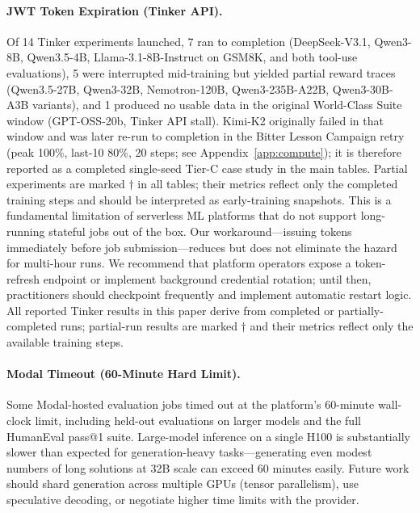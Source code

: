\documentclass{article}
\begin{document}
\paragraph{JWT Token Expiration (Tinker API).}
Of 14 Tinker experiments launched, 7 ran to completion (DeepSeek-V3.1,
Qwen3-8B, Qwen3.5-4B, Llama-3.1-8B-Instruct on GSM8K, and both tool-use
evaluations), 5 were interrupted mid-training but yielded partial reward
traces (Qwen3.5-27B, Qwen3-32B, Nemotron-120B, Qwen3-235B-A22B,
Qwen3-30B-A3B variants), and 1 produced no usable data in the original
World-Class Suite window (GPT-OSS-20b, Tinker API stall). Kimi-K2
originally failed in that window and was later re-run to completion in
the Bitter Lesson Campaign retry (peak 100\%, last-10 80\%, 20 steps;
see Appendix~\ref{app:compute}); it is therefore reported as a
completed single-seed Tier-C case study in the main tables.
Partial experiments are marked $\dagger$ in all tables; their
metrics reflect only the completed training steps and should be interpreted
as early-training snapshots. This is a fundamental
limitation of serverless ML platforms that do not support long-running
stateful jobs out of the box. Our workaround---issuing tokens immediately
before job submission---reduces but does not eliminate the hazard for
multi-hour runs. We recommend that platform operators expose a token-refresh
endpoint or implement background credential rotation; until then, practitioners
should checkpoint frequently and implement automatic restart logic. All
reported Tinker results in this paper derive from completed or partially-completed
runs; partial-run results are marked $\dagger$ and their metrics reflect
only the available training steps.

\paragraph{Modal Timeout (60-Minute Hard Limit).}
Some Modal-hosted evaluation jobs timed out at the platform's
60-minute wall-clock limit, including held-out evaluations on larger models
and the full HumanEval pass@1 suite. Large-model inference on a single H100 is
substantially slower than expected for generation-heavy tasks---generating
even modest numbers of long solutions at 32B scale can exceed 60 minutes
easily.
Future work should shard generation across multiple GPUs (tensor parallelism),
use speculative decoding, or negotiate higher time limits with the provider.
\end{document}
